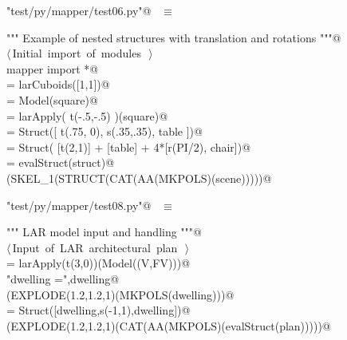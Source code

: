 \documentclass[11pt,oneside]{article}	%
\begin{document}
\begin{flushleft} \small \label{scrap40}
\verb@"test/py/mapper/test06.py"@\nobreak\ {\footnotesize {} }$\equiv$
\vspace{-1ex}
\begin{list}{}{} \item
\mbox{}\verb@""" Example of nested structures with translation and rotations """@\\
\mbox{}\verb@@\hbox{$\langle\,$Initial import of modules\nobreak\ {\footnotesize {}}$\,\rangle$}\verb@@\\
\mbox{}\verb@from mapper import *@\\
\mbox{}\verb@square = larCuboids([1,1])@\\
\mbox{}\verb@square = Model(square)@\\
\mbox{}\verb@table = larApply( t(-.5,-.5) )(square)@\\
\mbox{}\verb@chair = Struct([ t(.75, 0), s(.35,.35), table ])@\\
\mbox{}\verb@struct = Struct( [t(2,1)] + [table] + 4*[r(PI/2), chair])@\\
\mbox{}\verb@scene = evalStruct(struct)@\\
\mbox{}\verb@VIEW(SKEL_1(STRUCT(CAT(AA(MKPOLS)(scene)))))@\\
\mbox{}\verb@@{\NWsep}
\end{list}
\vspace{-2ex}
\end{flushleft}


\begin{flushleft} \small \label{scrap41}
\verb@"test/py/mapper/test08.py"@\nobreak\ {\footnotesize {} }$\equiv$
\vspace{-1ex}
\begin{list}{}{} \item
\mbox{}\verb@""" LAR model input and handling """@\\
\mbox{}\verb@@\hbox{$\langle\,$Input of LAR architectural plan\nobreak\ {\footnotesize {}}$\,\rangle$}\verb@@\\
\mbox{}\verb@dwelling = larApply(t(3,0))(Model((V,FV)))@\\
\mbox{}\verb@print "\n dwelling =",dwelling@\\
\mbox{}\verb@VIEW(EXPLODE(1.2,1.2,1)(MKPOLS(dwelling)))@\\
\mbox{}\verb@plan = Struct([dwelling,s(-1,1),dwelling])@\\
\mbox{}\verb@VIEW(EXPLODE(1.2,1.2,1)(CAT(AA(MKPOLS)(evalStruct(plan)))))@\\
\mbox{}\verb@@{\NWsep}
\end{list}
\vspace{-2ex}
\end{flushleft}
\end{document}
